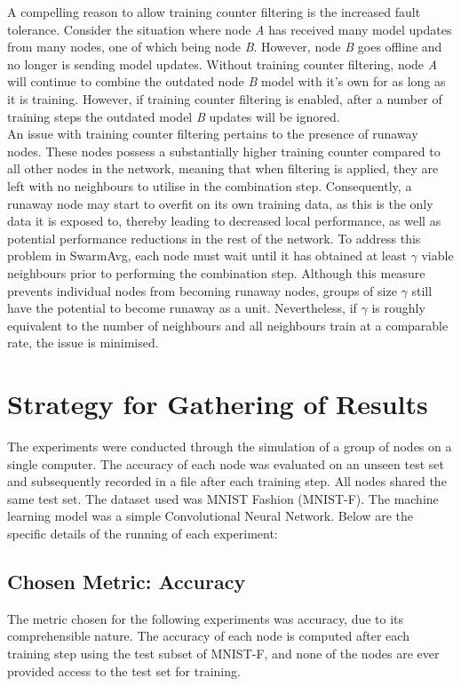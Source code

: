 \documentclass[letterpaper, 10 pt, conference]{ieeeconf}  %
\begin{document}
A compelling reason to allow training counter filtering is the increased fault tolerance. Consider the situation where node \emph{A} has received many model updates from many nodes, one of which being node \emph{B}. However, node \emph{B} goes offline and no longer is sending model updates. Without training counter filtering, node \emph{A} will continue to combine the outdated node \emph{B} model with it's own for as long as it is training. However, if training counter filtering is enabled, after a number of training steps the outdated model \emph{B} updates will be ignored. \\

An issue with training counter filtering pertains to the presence of runaway nodes. These nodes possess a substantially higher training counter compared to all other nodes in the network, meaning that when filtering is applied, they are left with no neighbours to utilise in the combination step. Consequently, a runaway node may start to overfit on its own training data, as this is the only data it is exposed to, thereby leading to decreased local performance, as well as potential performance reductions in the rest of the network. To address this problem in SwarmAvg, each node must wait until it has obtained at least $\gamma$ viable neighbours prior to performing the combination step. Although this measure prevents individual nodes from becoming runaway nodes, groups of size $\gamma$ still have the potential to become runaway as a unit. Nevertheless, if $\gamma$ is roughly equivalent to the number of neighbours and all neighbours train at a comparable rate, the issue is minimised.

\section{Strategy for Gathering of Results}\label{strats}
The experiments were conducted through the simulation of a group of nodes on a single computer. The accuracy of each node was evaluated on an unseen test set and subsequently recorded in a file after each training step. All nodes shared the same test set. The dataset used was MNIST Fashion (MNIST-F). The machine learning model was a simple Convolutional Neural Network. Below are the specific details of the running of each experiment:

\subsection{Chosen Metric: Accuracy}
The metric chosen for the following experiments was accuracy, due to its comprehensible nature. The accuracy of each node is computed after each training step using the test subset of MNIST-F, and none of the nodes are ever provided access to the test set for training.
\end{document}
